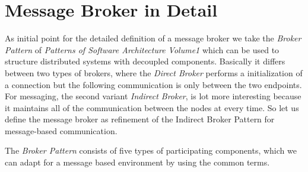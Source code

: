 
\section{Message Broker in Detail}
As initial point for the detailed definition of a message broker we take the
\textit{Broker Pattern} of  \textit{Patterns of Software Architecture Volume1}
which can be used to structure distributed systems with decoupled components.
Basically it differs between two types of brokers, where the \textit{Direct
Broker} performs a initialization of a connection but the following communication
is only between the two endpoints. For messaging, the second variant
\textit{Indirect Broker}, is lot more interesting because it maintains all of
the communication between the nodes at every time. So let us define the message
broker as refinement of the Indirect Broker Pattern for message-based
communication.\cite{POSA1} 

The \textit{Broker Pattern} consists of five types of participating components,
which we can adapt for a message based environment by using the common terms.


